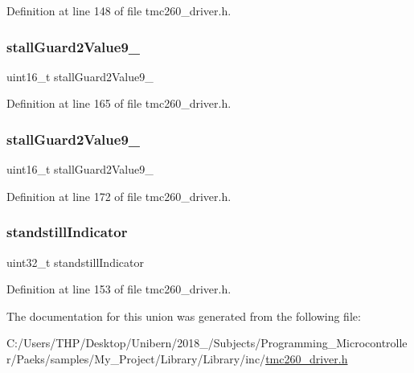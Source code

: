 Definition at line 148 of file tmc260\+\_\+driver.\+h.

\mbox{\label{uniontmc260___read_response___a9645739e0f29ac9b3fd2a6bf8e9fefef}} 
\subsubsection{\texorpdfstring{stall\+Guard2\+Value9\+\_}{stallGuard2Value9\_0}}
{\footnotesize\ttfamily uint16\+\_\+t stall\+Guard2\+Value9\+\_}



Definition at line 165 of file tmc260\+\_\+driver.\+h.

\mbox{\label{uniontmc260___read_response___a42cec8665b8aeb7962339668917eb8e4}} 
\subsubsection{\texorpdfstring{stall\+Guard2\+Value9\+\_}{stallGuard2Value9\_5}}
{\footnotesize\ttfamily uint16\+\_\+t stall\+Guard2\+Value9\+\_}



Definition at line 172 of file tmc260\+\_\+driver.\+h.

\mbox{\label{uniontmc260___read_response___a3ba6b5b6d17c535e9cdefe0ea2ff49fc}} 
\subsubsection{\texorpdfstring{standstill\+Indicator}{standstillIndicator}}
{\footnotesize\ttfamily uint32\+\_\+t standstill\+Indicator}



Definition at line 153 of file tmc260\+\_\+driver.\+h.



The documentation for this union was generated from the following file\+:\begin{DoxyCompactItemize}
\item 
C\+:/\+Users/\+T\+H\+P/\+Desktop/\+Unibern/2018\+\_/\+Subjects/\+Programming\+\_\+\+Microcontroller/\+Paeks/samples/\+My\+\_\+\+Project/\+Library/\+Library/inc/\mbox{\hyperlink{tmc260__driver_8h}{tmc260\+\_\+driver.\+h}}\end{DoxyCompactItemize}

